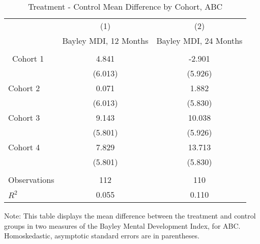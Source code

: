 \begin{table}[H] 
\begin{threeparttable}
\caption{Treatment - Control Mean Difference by Cohort, ABC}
\label{table:cohorts}
\centering 
\begin{tabular}{lcc} \hline \hline
 & (1) & (2) \\
 & Bayley MDI, 12 Months & Bayley MDI, 24 Months \\ \hline
 &  &  \\\
Cohort 1 & 4.841 & -2.901 \\
 & (6.013) & (5.926) \\
Cohort 2 & 0.071 & 1.882 \\
 & (6.013) & (5.830) \\
Cohort 3 & 9.143 & 10.038 \\
 & (5.801) & (5.926) \\
Cohort 4 & 7.829 & 13.713 \\
 & (5.801) & (5.830) \\ \\ \hline
Observations & 112 & 110 \\
$R^2$ & 0.055 & 0.110 \\ \hline \hline 
 \end{tabular}
\begin{tablenotes}
\footnotesize
\item Note: This table displays the mean difference between the treatment and control groups in two measures of the Bayley Mental Development Index, for ABC. Homoskedastic, asymptotic standard errors are in parentheses.
\end{tablenotes}
\end{threeparttable}
\end{table}